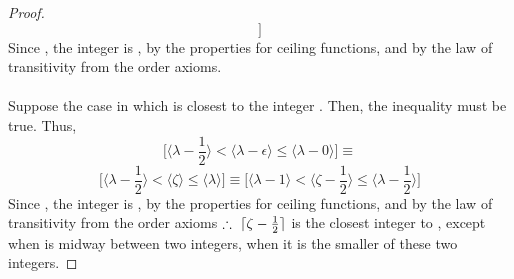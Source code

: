 \documentclass[preview]{standalone}
\begin{document}
\begin{proof}
\begin{equation*}
        \bigg]
    \end{equation*}
    Since 
    ,
    the integer  is 
    \bm{$\big \langle \lambda - 1 \big \rangle$}, 
    by the properties for ceiling functions,
    and by the law of transitivity from the order axioms.
    \\ \\
     Suppose the case in which 
    \bm{$\zeta$} is closest to the integer \bm{$\lambda$}. 
    Then, the inequality 
    must be true. Thus, 
    \begin{equation*}
        \bigg[
            \Big \langle
                \lambda - \frac{1}{2}
            \Big \rangle
                <
            \Big \langle
                \lambda - \epsilon
            \Big \rangle
                \leq
            \Big \langle
                \lambda - 0
            \Big \rangle
        \bigg]
            \equiv
    \end{equation*}
    \begin{equation*}
        \bigg[
            \Big \langle
                \lambda - \frac{1}{2}
            \Big \rangle
                <
            \Big \langle
                \zeta
            \Big \rangle
                \leq
            \Big \langle
                \lambda
            \Big \rangle
        \bigg]
            \equiv
        \bigg[
            \Big \langle
                \lambda - 1
            \Big \rangle
                <
            \Big \langle
                \zeta - \frac{1}{2}
            \Big \rangle
                \leq
            \Big \langle
                \lambda - \frac{1}{2}
            \Big \rangle
        \bigg]
    \end{equation*}
    Since 
    , 
    the integer  is 
    \bm{$\big \langle \lambda \big \rangle$}, 
    by the properties for ceiling functions,
    and by the law of transitivity from the order axioms
    $\therefore \text{\space} \relax{
    \lceil \zeta - \frac{1}{2} \rceil}$ 
    is the closest integer to \bm{$\zeta$}, 
    except when \bm{$\zeta$} is midway between two integers, 
    when it is the smaller of these two integers.
\end{proof}
\end{document}
